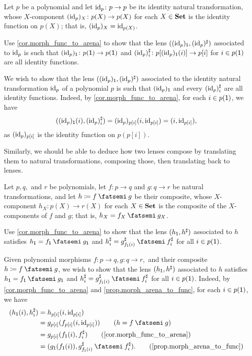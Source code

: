 \documentclass[Book-Poly]{subfiles}
\begin{document}
\begin{exercise} \label{exc.arena_morph_id}
Let $p$ be a polynomial and let $\mathrm{id}_p \colon p \to p$ be its identity natural transformation, whose $X$-component $(\mathrm{id}_p)_X \colon p(X) \to p(X)$ for each $X \in \mathbf{Set}$ is the identity function on $p(X)$; that is, $(\mathrm{id}_p)_X = \mathrm{id}_{p(X)}$.

Use \cref{cor.morph_func_to_arena} to show that the lens $((\mathrm{id}_p)_{\textsf{1}}, (\mathrm{id}_p)^\sharp)$ associated to $\mathrm{id}_p$ is such that $(\mathrm{id}_p)_{\textsf{1}} \colon p(\textsf{1}) \to p(\textsf{1})$ and $(\mathrm{id}_p)^\sharp_i \colon p[(\mathrm{id}_p)_{\textsf{1}}(i)] \to p[i]$ for $i \in p(\textsf{1})$ are all identity functions.
\begin{solution}
We wish to show that the lens $((\mathrm{id}_p)_{\textsf{1}}, (\mathrm{id}_p)^\sharp)$ associated to the identity natural transformation $\mathrm{id}_p$ of a polynomial $p$ is such that $(\mathrm{id}_p)_{\textsf{1}}$ and every $(\mathrm{id}_p)^\sharp_i$ are all identity functions.
Indeed, by \cref{cor.morph_func_to_arena}, for each $i \in p(\textsf{1})$, we have
\[
    ((\mathrm{id}_p)_{\textsf{1}}(i), (\mathrm{id}_p)^\sharp_i) = (\mathrm{id}_p)_{p[i]}(i, \mathrm{id}_{p[i]}) = (i, \mathrm{id}_{p[i]}),
\]
as $(\mathrm{id}_p)_{p[i]}$ is the identity function on $p(p[i])$.
\end{solution}
\end{exercise}

Similarly, we should be able to deduce how two lenses compose by translating them to natural transformations, composing those, then translating back to lenses.

\begin{exercise} \label{exc.arena_morph_comp}
Let $p,q,$ and $r$ be polynomials, let $f \colon p \to q$ and $g \colon q \to r$ be natural transformations, and let $h \coloneqq f \then g$ be their composite, whose $X$-component $h_X \colon p(X) \to r(X)$ for each $X \in \mathbf{Set}$ is the composite of the $X$-components of $f$ and $g$; that is, $h_X = f_X \then g_X$.

Use \cref{cor.morph_func_to_arena} to show that the lens $(h_{\textsf{1}}, h^\sharp)$ associated to $h$ satisfies $h_\1 = f_\1 \then g_\1$ and $h^\sharp_i = g^\sharp_{f_\1(i)} \then f^\sharp_i$ for all $i \in p(\textsf{1})$.
\begin{solution}
Given polynomial morphisms $f \colon p \to q, g \colon q \to r,$ and their composite $h \coloneqq f \then g$, we wish to show that the lens $(h_{\textsf{1}}, h^\sharp)$ associated to $h$ satisfies $h_\1 = f_\1 \then g_\1$ and $h^\sharp_i = g^\sharp_{f_\1(i)} \then f^\sharp_i$ for all $i \in p(\textsf{1})$.
Indeed, by \cref{cor.morph_func_to_arena} and \cref{prop.morph_arena_to_func}, for each $i \in p(\textsf{1})$, we have
\begin{align*}
    (h_\1(i), h^\sharp_i) &= h_{p[i]}(i, \id_{p[i]}) \\
    &= g_{p[i]}(f_{p[i]}(i, \id_{p[i]})) \tag{$h = f \then g$} \\
    &= g_{p[i]}(f_\1(i), f^\sharp_i) \tag{\cref{cor.morph_func_to_arena}} \\
    &= (g_\1(f_\1(i)), g^\sharp_{f_\1(i)} \then f^\sharp_i). \tag{\cref{prop.morph_arena_to_func}}
\end{align*}
\end{solution}
\end{exercise}
\end{document}
